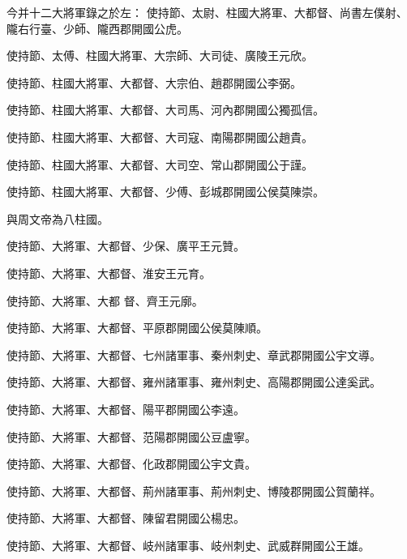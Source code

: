 \begin{pinyinscope}
 今并十二大將軍錄之於左：
 使持節、太尉、柱國大將軍、大都督、尚書左僕射、隴右行臺、少師、隴西郡開國公虎。



 使持節、太傅、柱國大將軍、大宗師、大司徒、廣陵王元欣。



 使持節、柱國大將軍、大都督、大宗伯、趙郡開國公李弼。



 使持節、柱國大將軍、大都督、大司馬、河內郡開國公獨孤信。



 使持節、柱國大將軍、大都督、大司寇、南陽郡開國公趙貴。



 使持節、柱國大將軍、大都督、大司空、常山郡開國公于謹。



 使持節、柱國大將軍、大都督、少傅、彭城郡開國公侯莫陳崇。



 與周文帝為八柱國。



 使持節、大將軍、大都督、少保、廣平王元贊。



 使持節、大將軍、大都督、淮安王元育。



 使持節、大將軍、大都
 督、齊王元廓。



 使持節、大將軍、大都督、平原郡開國公侯莫陳順。



 使持節、大將軍、大都督、七州諸軍事、秦州刺史、章武郡開國公宇文導。



 使持節、大將軍、大都督、雍州諸軍事、雍州刺史、高陽郡開國公達奚武。



 使持節、大將軍、大都督、陽平郡開國公李遠。



 使持節、大將軍、大都督、范陽郡開國公豆盧寧。



 使持節、大將軍、大都督、化政郡開國公宇文貴。



 使持節、大將軍、大都督、荊州諸軍事、荊州刺史、博陵郡開國公賀蘭祥。



 使持節、大將軍、大都督、陳留君開國公楊忠。



 使持節、大將軍、大都督、岐州諸軍事、岐州刺史、武威群開國公王雄。




\end{pinyinscope}
